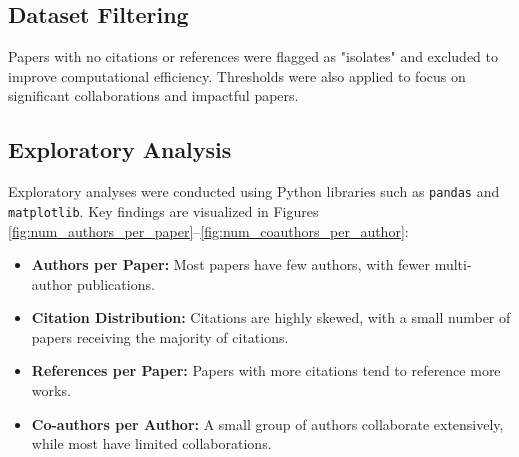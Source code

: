\documentclass[11pt]{article}
\begin{document}
\subsection{Dataset Filtering}

Papers with no citations or references were flagged as "isolates" and excluded to improve computational efficiency. Thresholds were also applied to focus on significant collaborations and impactful papers.

\subsection{Exploratory Analysis}

Exploratory analyses were conducted using Python libraries such as \texttt{pandas} and \texttt{matplotlib}. Key findings are visualized in Figures \ref{fig:num_authors_per_paper}--\ref{fig:num_coauthors_per_author}:
\begin{itemize}
	\item \textbf{Authors per Paper:} Most papers have few authors, with fewer multi-author publications.
	\item \textbf{Citation Distribution:} Citations are highly skewed, with a small number of papers receiving the majority of citations.
	\item \textbf{References per Paper:} Papers with more citations tend to reference more works.
	\item \textbf{Co-authors per Author:} A small group of authors collaborate extensively, while most have limited collaborations.
\end{itemize}
\end{document}
